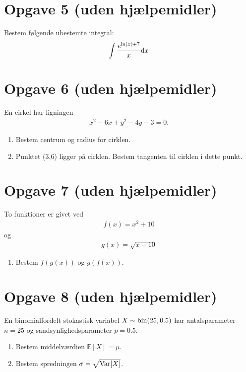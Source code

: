 \documentclass[12pt]{article}
\begin{document}
\section*{Opgave 5 (uden hjælpemidler)}

Bestem følgende ubestemte integral:
\begin{align*}
\int \frac{e^{\ln(x)+7}}{x} \textnormal{d} x
\end{align*}

\section*{Opgave 6 (uden hjælpemidler)}
En cirkel har ligningen 
\begin{align*}
x^2-6x+y^2-4y-3=0.
\end{align*}
\begin{enumerate}[label=\roman*)]
\item Bestem centrum og radius for cirklen. 
\item Punktet (3,6) ligger på cirklen. Bestem tangenten til cirklen i dette punkt. 
\end{enumerate}
\section*{Opgave 7 (uden hjælpemidler)}
To funktioner er givet ved 
\begin{align*}
f(x) = x^2+10
\end{align*}
og 
\begin{align*}
g(x) = \sqrt{x-10}
\end{align*}

\begin{enumerate}[label=\roman*)]
\item Bestem $f(g(x))$ og $g(f(x))$.
\end{enumerate}
\section*{Opgave 8 (uden hjælpemidler)}

En binomialfordelt stokastisk variabel $X \sim \textnormal{bin}(25,0.5)$ har antalsparameter $n=25$ og sandsynlighedsparameter $p=0.5$.
\begin{enumerate}[label=\roman*)]
\item Bestem middelværdien $\mathbb{E}[X] = \mu$.
\item Bestem spredningen $\sigma = \sqrt{\textnormal{Var}[X]}$.
\end{enumerate} 
\end{document}
